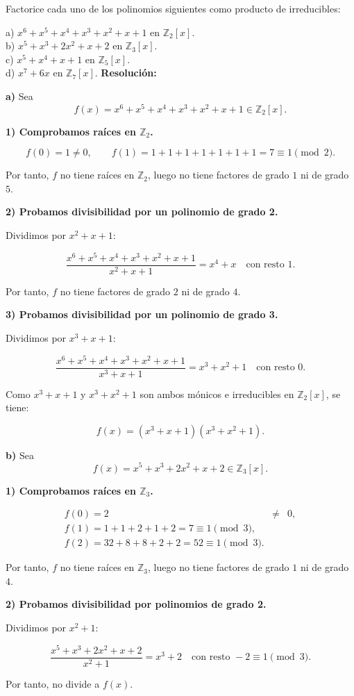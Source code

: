 \documentclass[a4paper,12pt]{article}
\begin{document}
\begin{ejercicio}[title=Ejercicio 52]
Factorice cada uno de los polinomios siguientes como producto de irreducibles:

a) $x^6 + x^5 + x^4 + x^3 + x^2 + x + 1$ en $\mathbb{Z}_2[x]$.  \\
b) $x^5 + x^3 + 2x^2 + x + 2$ en $\mathbb{Z}_3[x]$.  \\
c) $x^5 + x^4 + x + 1$ en $\mathbb{Z}_5[x]$.  \\
d) $x^7 + 6x$ en $\mathbb{Z}_7[x]$.
\tcblower
\textbf{Resolución:}

\textbf{a)} Sea 
\[
f(x) = x^6 + x^5 + x^4 + x^3 + x^2 + x + 1 \in \mathbb{Z}_2[x].
\]

\textbf{1) Comprobamos raíces en $\mathbb{Z}_2$.}

\[
f(0) = 1 \neq 0, \qquad f(1) = 1 + 1 + 1 + 1 + 1 + 1 + 1 = 7 \equiv 1 \pmod{2}.
\]

Por tanto, $f$ no tiene raíces en $\mathbb{Z}_2$, luego no tiene factores de grado $1$ ni de grado $5$.

\vspace{0.5em}
\textbf{2) Probamos divisibilidad por un polinomio de grado 2.}

Dividimos por $x^2 + x + 1$:

\[
\dfrac{x^6 + x^5 + x^4 + x^3 + x^2 + x + 1}{x^2 + x + 1} = x^4 + x \quad \text{con resto } 1.
\]

Por tanto, $f$ no tiene factores de grado $2$ ni de grado $4$.

\vspace{0.5em}
\textbf{3) Probamos divisibilidad por un polinomio de grado 3.}

Dividimos por $x^3 + x + 1$:

\[
\dfrac{x^6 + x^5 + x^4 + x^3 + x^2 + x + 1}{x^3 + x + 1} = x^3 + x^2 + 1 \quad \text{con resto } 0.
\]

Como $x^3 + x + 1$ y $x^3 + x^2 + 1$ son ambos mónicos e irreducibles en $\mathbb{Z}_2[x]$, se tiene:

\[
\boxed{f(x) = (x^3 + x + 1)(x^3 + x^2 + 1).}
\]

\textbf{b)} Sea 
\[
f(x) = x^5 + x^3 + 2x^2 + x + 2 \in \mathbb{Z}_3[x].
\]

\textbf{1) Comprobamos raíces en $\mathbb{Z}_3$.}

\[
\begin{array}{lcl}
f(0) = 2 &\neq& 0, \\
f(1) = 1 + 1 + 2 + 1 + 2 = 7 \equiv 1 \pmod{3}, \\
f(2) = 32 + 8 + 8 + 2 + 2 = 52 \equiv 1 \pmod{3}.
\end{array}
\]

Por tanto, $f$ no tiene raíces en $\mathbb{Z}_3$, luego no tiene factores de grado $1$ ni de grado $4$.

\vspace{0.5em}
\textbf{2) Probamos divisibilidad por polinomios de grado 2.}

Dividimos por $x^2 + 1$:

\[
\dfrac{x^5 + x^3 + 2x^2 + x + 2}{x^2 + 1} = x^3 + 2 \quad \text{con resto } -2 \equiv 1 \pmod{3}.
\]

Por tanto, no divide a $f(x)$.

\end{ejercicio}
\end{document}
